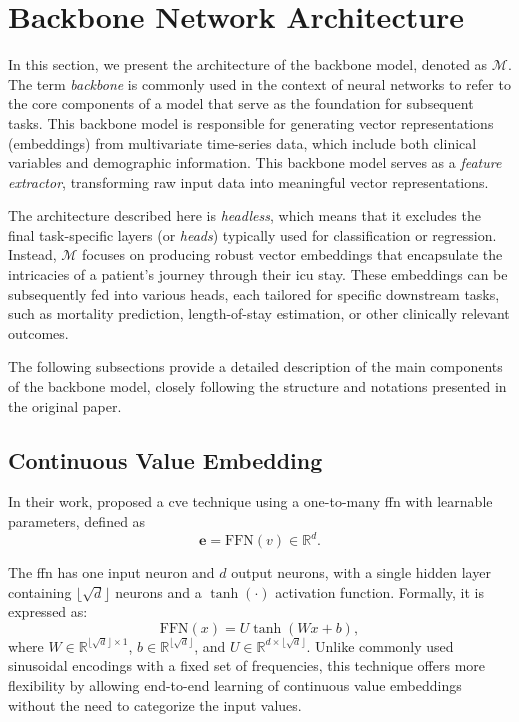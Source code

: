 \section{Backbone Network Architecture}
\label{sec:backbone}

In this section, we present the architecture of the backbone model, denoted as \(\mathcal{M}\). The term \textit{backbone} is commonly used in the context of neural networks to refer to the core components of a model that serve as the foundation for subsequent tasks. This backbone model is responsible for generating vector representations (embeddings) from multivariate time-series data, which include both clinical variables and demographic information. This backbone model serves as a \emph{feature extractor}, transforming raw input data into meaningful vector representations.

The architecture described here is \emph{headless}, which means that it excludes the final task-specific layers (or \emph{heads}) typically used for classification or regression. Instead, \(\mathcal{M}\) focuses on producing robust vector embeddings that encapsulate the intricacies of a patient's journey through their \gls{icu} stay. These embeddings can be subsequently fed into various heads, each tailored for specific downstream tasks, such as mortality prediction, length-of-stay estimation, or other clinically relevant outcomes.

The following subsections provide a detailed description of the main components of the backbone model, closely following the structure and notations presented in the original paper.

\subsection{Continuous Value Embedding}
\label{sec:cve}

In their work, \citeauthor{STraTS2022} proposed a \gls{cve} technique using a one-to-many \gls{ffn} with learnable parameters, defined as
\[ \mathbf{e} = \text{FFN}(v) \in \mathbb{R}^d. \]

The \gls{ffn} has one input neuron and \(d\) output neurons, with a single hidden layer containing \(\lfloor \sqrt{d} \rfloor\) neurons and a \(\tanh(\cdot)\) activation function. Formally, it is expressed as:
\[
\text{FFN}(x) = U \tanh(Wx + b),
\]
where \(W \in \mathbb{R}^{\lfloor \sqrt{d} \rfloor \times 1}\), \(b \in \mathbb{R}^{\lfloor \sqrt{d} \rfloor}\), and \(U \in \mathbb{R}^{d \times \lfloor \sqrt{d} \rfloor}\). Unlike commonly used sinusoidal encodings with a fixed set of frequencies, this technique offers more flexibility by allowing end-to-end learning of continuous value embeddings without the need to categorize the input values.

